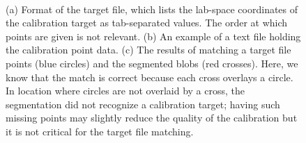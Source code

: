 \documentclass[10pt,a4paper]{article}
\begin{document}
\begin{figure}[!ht]
	\centering
	\\
	\caption{(a) Format of the target file, which lists the lab-space coordinates of the calibration target as tab-separated values. The order at which points are given is not relevant. (b) An example of a text file holding the calibration point data. (c) The results of matching a target file points (blue circles) and the segmented blobs (red crosses). Here, we know that the match is correct because each cross overlays a circle. In location where circles are not overlaid by a cross, the segmentation did not recognize a calibration target; having such missing points may slightly reduce the quality of the calibration but it is not critical for the target file matching.}
\end{figure}
\end{document}

